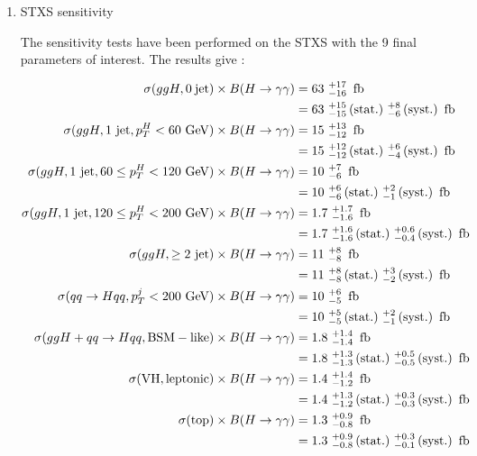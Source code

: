 \begin{enumerate}
\item STXS sensitivity
\label{sec:orgf8074b1}

The sensitivity tests have been performed on the STXS with the 9 final parameters of interest.
The results give :

\begin{align*}
  \tiny
  \sigma (ggH, \mathrm{0~jet}) \tbfhyy &= 63\ ^{+17}_{-16}\ \fb \\ &= 63\ ^{+15}_{-15}\,\mathrm{(stat.)}\ ^{+8}_{-6}\,\mathrm{(syst.)}\ \fb \\
  \sigma (ggH, \mathrm{1~jet}, p_T^{H} < 60\ \text{GeV}) \tbfhyy &= 15\ ^{+13}_{-12}\ \fb \\ &= 15\ ^{+12}_{-12}\,\mathrm{(stat.)}\ ^{+6}_{-4}\,\mathrm{(syst.)}\ \fb \\
  \sigma (ggH, \mathrm{1~jet}, 60 \leq p_T^{H} < 120\ \text{GeV}) \tbfhyy &= 10\ ^{+7}_{-6}\ \fb \\ &= 10\ ^{+6}_{-6}\,\mathrm{(stat.)}\ ^{+2}_{-1}\,\mathrm{(syst.)}\ \fb \\
  \sigma (ggH, \mathrm{1~jet}, 120 \leq p_T^{H} < 200\ \text{GeV}) \tbfhyy &= 1.7\ ^{+1.7}_{-1.6}\ \fb \\ &= 1.7\ ^{+1.6}_{-1.6}\,\mathrm{(stat.)}\ ^{+0.6}_{-0.4}\,\mathrm{(syst.)}\ \fb \\
  \sigma (ggH, \geq 2~\mathrm{jet}) \tbfhyy &= 11\ ^{+8}_{-8}\ \fb \\ &= 11\ ^{+8}_{-8}\,\mathrm{(stat.)}\ ^{+3}_{-2}\,\mathrm{(syst.)}\ \fb \\
  \sigma (qq \rightarrow Hqq, p_T^{j} < 200~\text{GeV}) \tbfhyy &= 10\ ^{+6}_{-5}\ \fb \\ &= 10\ ^{+5}_{-5}\,\mathrm{(stat.)}\ ^{+2}_{-1}\,\mathrm{(syst.)}\ \fb \\
  \sigma (ggH + qq \rightarrow Hqq, \mathrm{BSM-like}) \tbfhyy &= 1.8\ ^{+1.4}_{-1.4}\ \fb \\ &= 1.8\ ^{+1.3}_{-1.3}\,\mathrm{(stat.)}\ ^{+0.5}_{-0.5}\,\mathrm{(syst.)}\ \fb \\
  \sigma (\mathrm{VH, leptonic}) \tbfhyy &= 1.4\ ^{+1.4}_{-1.2}\ \fb \\ &= 1.4\ ^{+1.3}_{-1.2}\,\mathrm{(stat.)}\ ^{+0.3}_{-0.3}\,\mathrm{(syst.)}\ \fb \\
  \sigma (\mathrm{top}) \tbfhyy &= 1.3\ ^{+0.9}_{-0.8}\ \fb \\ &= 1.3\ ^{+0.9}_{-0.8}\,\mathrm{(stat.)}\ ^{+0.3}_{-0.1}\,\mathrm{(syst.)}\ \fb \\
\end{align*}


\end{enumerate}
